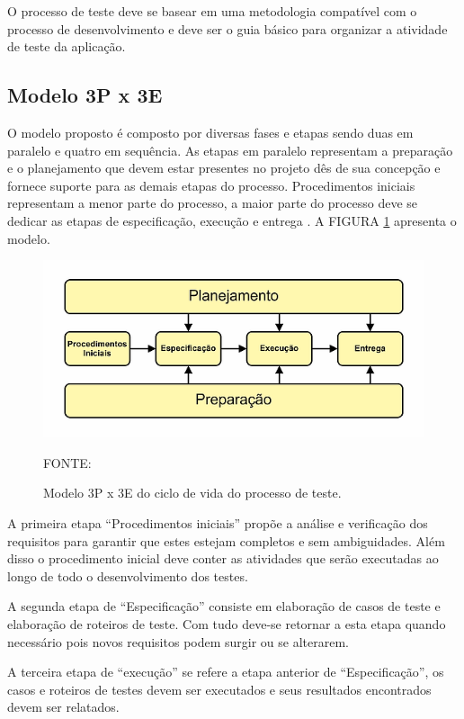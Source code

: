 O processo de teste deve se basear em uma metodologia compatível com o processo de desenvolvimento e deve ser o guia básico para organizar a atividade de teste da aplicação. 


\subsection{Modelo 3P x 3E}

O modelo proposto é composto por diversas fases e etapas sendo duas em paralelo e quatro em sequência. As etapas em paralelo representam a preparação e o planejamento que devem estar presentes no projeto dês de sua concepção e fornece suporte para as demais etapas do processo. Procedimentos iniciais representam a menor parte do processo, a maior parte do processo deve se dedicar as etapas de especificação, execução e entrega \cite{riosMoreira}. A FIGURA \ref{modelo3p3e} apresenta o modelo.


\begin{figure}[H]
	\centering
	\includegraphics[scale=3.5]{dados/figuras/modelo3px3e.png}
	\caption{Modelo 3P x 3E do ciclo de vida do processo de teste.}FONTE: \cite{riosMoreira}
	\label{modelo3p3e}
\end{figure}



A primeira etapa “Procedimentos iniciais” propõe a análise e verificação dos requisitos para garantir que estes estejam completos e sem ambiguidades. Além disso o procedimento inicial deve conter as atividades que serão executadas ao longo de todo o desenvolvimento dos testes.


A segunda etapa de “Especificação” consiste em elaboração de casos de teste e elaboração de roteiros de teste. Com tudo deve-se retornar a esta etapa quando necessário pois novos requisitos podem surgir ou se alterarem.

A terceira etapa de “execução” se refere a etapa anterior de “Especificação”, os casos e roteiros de testes devem ser executados e seus resultados encontrados devem ser relatados.


